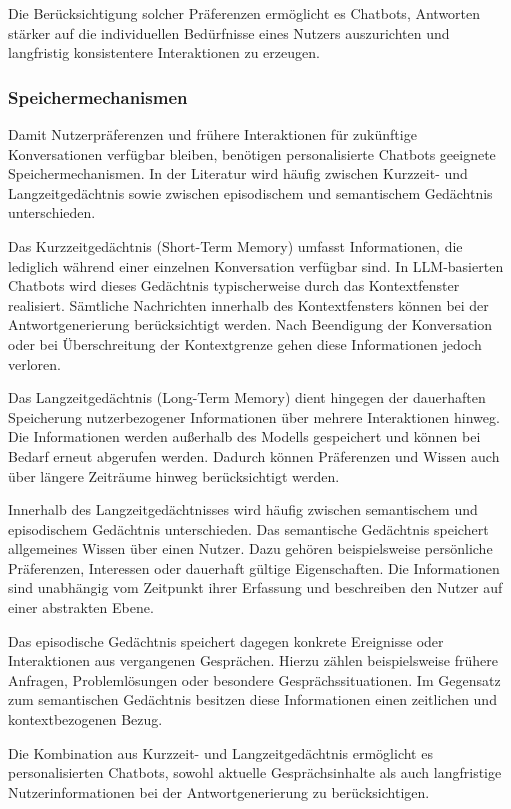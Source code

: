 Die Berücksichtigung solcher Präferenzen ermöglicht es Chatbots, Antworten stärker auf die individuellen Bedürfnisse eines Nutzers auszurichten und langfristig konsistentere Interaktionen zu erzeugen.

\subsubsection{Speichermechanismen}

Damit Nutzerpräferenzen und frühere Interaktionen für zukünftige Konversationen verfügbar bleiben, benötigen personalisierte Chatbots geeignete Speichermechanismen. In der Literatur wird häufig zwischen Kurzzeit- und Langzeitgedächtnis sowie zwischen episodischem und semantischem Gedächtnis unterschieden.

Das Kurzzeitgedächtnis (Short-Term Memory) umfasst Informationen, die lediglich während einer einzelnen Konversation verfügbar sind. In LLM-basierten Chatbots wird dieses Gedächtnis typischerweise durch das Kontextfenster realisiert. Sämtliche Nachrichten innerhalb des Kontextfensters können bei der Antwortgenerierung berücksichtigt werden. Nach Beendigung der Konversation oder bei Überschreitung der Kontextgrenze gehen diese Informationen jedoch verloren.

Das Langzeitgedächtnis (Long-Term Memory) dient hingegen der dauerhaften Speicherung nutzerbezogener Informationen über mehrere Interaktionen hinweg. Die Informationen werden außerhalb des Modells gespeichert und können bei Bedarf erneut abgerufen werden. Dadurch können Präferenzen und Wissen auch über längere Zeiträume hinweg berücksichtigt werden.

Innerhalb des Langzeitgedächtnisses wird häufig zwischen semantischem und episodischem Gedächtnis unterschieden. Das semantische Gedächtnis speichert allgemeines Wissen über einen Nutzer. Dazu gehören beispielsweise persönliche Präferenzen, Interessen oder dauerhaft gültige Eigenschaften. Die Informationen sind unabhängig vom Zeitpunkt ihrer Erfassung und beschreiben den Nutzer auf einer abstrakten Ebene.

Das episodische Gedächtnis speichert dagegen konkrete Ereignisse oder Interaktionen aus vergangenen Gesprächen. Hierzu zählen beispielsweise frühere Anfragen, Problemlösungen oder besondere Gesprächssituationen. Im Gegensatz zum semantischen Gedächtnis besitzen diese Informationen einen zeitlichen und kontextbezogenen Bezug.

Die Kombination aus Kurzzeit- und Langzeitgedächtnis ermöglicht es personalisierten Chatbots, sowohl aktuelle Gesprächsinhalte als auch langfristige Nutzerinformationen bei der Antwortgenerierung zu berücksichtigen.

